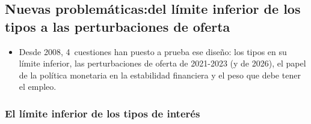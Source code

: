\documentclass[11pt]{article}
\begin{document}
\subsection{Nuevas problemáticas:\cortetitulo del límite inferior de los tipos a las perturbaciones de oferta}\label{sec:nuevas}

\begin{itemize}
\item Desde 2008, 4~cuestiones han puesto a prueba ese diseño: los tipos en su límite inferior, las perturbaciones de oferta de 2021-2023 (y de 2026), el papel de la política monetaria en la estabilidad financiera y el peso que debe tener el empleo.
\end{itemize}

\subsubsection{El límite inferior de los tipos de interés}\label{sec:limite-inferior}
\end{document}
